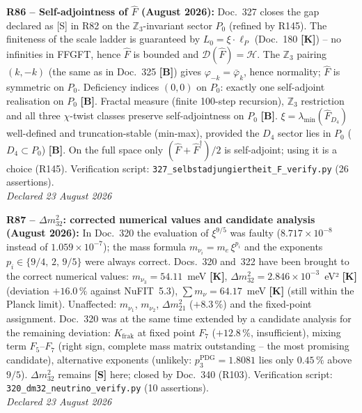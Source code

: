 \textbf{R86 -- Self-adjointness of $\hat{F}$ (August 2026):}
Doc.~327 closes the gap declared as [S] in R82 on the $\mathbb{Z}_3$-invariant sector $P_0$ (refined by R145).
The finiteness of the scale ladder is guaranteed by $L_0 = \xi\cdot\ell_P$
(Doc.~180 \textbf{[K]}) -- no infinities in FFGFT,
hence $\hat{F}$ is bounded and $\mathcal{D}(\hat{F}) = \mathcal{H}$.
The $\mathbb{Z}_3$ pairing $(k,-k)$ (the same as in Doc.~325 \textbf{[B]}) gives
$\varphi_{-k}=\bar\varphi_k$, hence normality; $\hat{F}$ is symmetric on $P_0$.
Deficiency indices $(0,0)$ on $P_0$: exactly one self-adjoint realisation on $P_0$ \textbf{[B]}.
Fractal measure (finite 100-step recursion), $\mathbb{Z}_3$ restriction
and all three $\chi$-twist classes preserve self-adjointness on $P_0$ \textbf{[B]}.
$\xi = \lambda_{\min}(\hat{F}_{D_4})$ well-defined and truncation-stable
(min-max), provided the $D_4$ sector lies in $P_0$ ($D_4 \subset P_0$) \textbf{[B]}.
On the full space only $(\hat{F}+\hat{F}^\dagger)/2$ is self-adjoint; using it is a choice (R145).
Verification script: \texttt{327\_selbstadjungiertheit\_F\_verify.py} (26 assertions).\\
\emph{Declared 23 August 2026}

\medskip

\textbf{R87 -- $\Delta m_{32}^2$: corrected numerical values and candidate analysis (August 2026):}
In Doc.~320 the evaluation of $\xi^{9/5}$ was faulty ($8.717\times10^{-8}$ instead of
$1.059\times10^{-7}$); the mass formula $m_{\nu_i} = m_e\,\xi^{p_i}$ and the exponents
$p_i \in \{9/4,\,2,\,9/5\}$ were always correct. Docs.~320 and~322 have been brought to
the correct numerical values: $m_{\nu_3} = 54.11$~meV \textbf{[K]},
$\Delta m_{32}^2 = 2.846\times10^{-3}$~eV² \textbf{[K]} (deviation $+16.0\,\%$ against
NuFIT~5.3), $\sum m_\nu = 64.17$~meV \textbf{[K]} (still within the Planck limit).
Unaffected: $m_{\nu_1}$, $m_{\nu_2}$, $\Delta m_{21}^2$ ($+8.3\,\%$) and the fixed-point
assignment. Doc.~320 was at the same time extended by a candidate analysis for the
remaining deviation: $K_{\mathrm{frak}}$ at fixed point $F_7$ ($+12.8\,\%$,
insufficient), mixing term $F_5$--$F_7$ (right sign, complete mass matrix outstanding --
the most promising candidate), alternative exponents (unlikely:
$p_3^{\mathrm{PDG}} = 1.8081$ lies only $0.45\,\%$ above $9/5$).
$\Delta m_{32}^2$ remains \textbf{[S]} here; closed by Doc.~340 (R103).
Verification script: \texttt{320\_dm32\_neutrino\_verify.py} (10 assertions).\\
\emph{Declared 23 August 2026}

